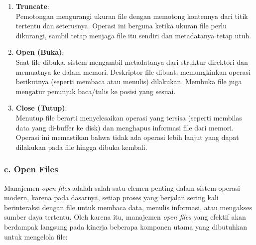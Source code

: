 \documentclass[12pt]{article}
\begin{document}
\begin{enumerate}
    \item \textbf{Truncate}: \\
    Pemotongan mengurangi ukuran file dengan memotong kontennya dari titik tertentu dan seterusnya. Operasi ini berguna ketika ukuran file perlu dikurangi, sambil tetap menjaga file itu sendiri dan metadatanya tetap utuh.
    
    \item \textbf{Open (Buka)}: \\
    Saat file dibuka, sistem mengambil metadatanya dari struktur direktori dan memuatnya ke dalam memori. Deskriptor file dibuat, memungkinkan operasi berikutnya (seperti membaca atau menulis) dilakukan. Membuka file juga mengatur penunjuk baca/tulis ke posisi yang sesuai.
    
    \item \textbf{Close (Tutup)}: \\
    Menutup file berarti menyelesaikan operasi yang tersisa (seperti membilas data yang di-buffer ke disk) dan menghapus informasi file dari memori. Operasi ini memastikan bahwa tidak ada operasi lebih lanjut yang dapat dilakukan pada file hingga dibuka kembali.
\end{enumerate}
\subsubsection*{c. Open Files}



Manajemen \textit{open files} adalah salah satu elemen penting dalam sistem operasi modern, karena pada dasarnya, setiap proses yang berjalan sering kali berinteraksi dengan file untuk membaca data, menulis informasi, atau mengakses sumber daya tertentu. Oleh karena itu, manajemen \textit{open files} yang efektif akan berdampak langsung pada kinerja beberapa komponen utama yang dibutuhkan untuk mengelola file:
\end{document}

